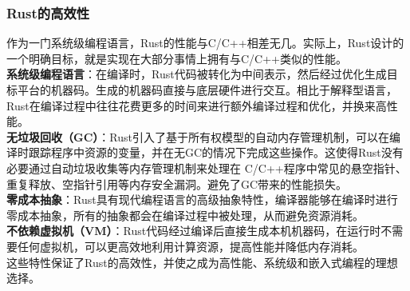 \documentclass{article}
\begin{document}
\subsubsection{Rust的高效性}
作为一门系统级编程语言，Rust的性能与C/C++相差无几\supercite{ref3}。实际上，Rust设计的一个明确目标，就是实现在大部分事情上拥有与C/C++类似的性能。\\
\textbf{系统级编程语言}：在编译时，Rust代码被转化为中间表示，然后经过优化生成目标平台的机器码。生成的机器码直接与底层硬件进行交互。相比于解释型语言，Rust在编译过程中往往花费更多的时间来进行额外编译过程和优化，并换来高性能。\\
\textbf{无垃圾回收（GC）}：Rust引入了基于所有权模型的自动内存管理机制，可以在编译时跟踪程序中资源的变量，并在无GC的情况下完成这些操作。这使得Rust没有必要通过自动垃圾收集等内存管理机制来处理在 C/C++程序中常见的悬空指针、重复释放、空指针引用等内存安全漏洞。避免了GC带来的性能损失。\\
\textbf{零成本抽象}：Rust具有现代编程语言的高级抽象特性，编译器能够在编译时进行零成本抽象，所有的抽象都会在编译过程中被处理，从而避免资源消耗。\\
\textbf{不依赖虚拟机（VM）}：Rust代码经过编译后直接生成本机机器码，在运行时不需要任何虚拟机，可以更高效地利用计算资源，提高性能并降低内存消耗。\\
这些特性保证了Rust的高效性，并使之成为高性能、系统级和嵌入式编程的理想选择。
\end{document}
